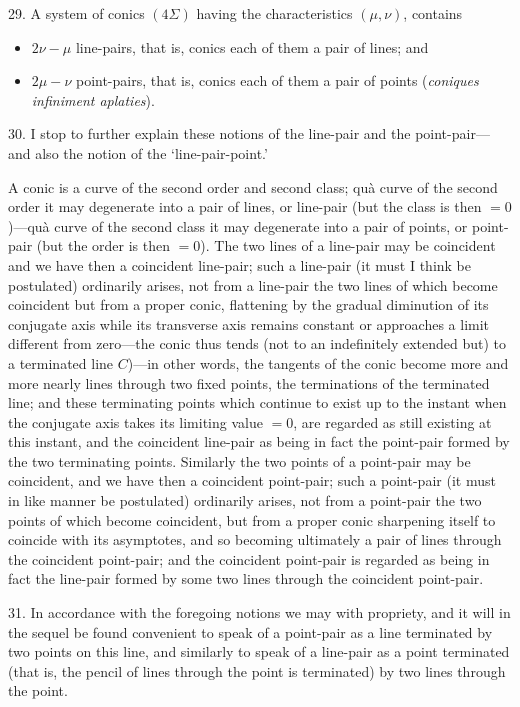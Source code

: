 \documentclass[12pt,a4paper]{article}
\begin{document}
29. A system of conics $(4\Sigma)$ having the characteristics $(\mu, \nu)$, contains
\begin{itemize}[noitemsep,topsep=0pt]
\item $2\nu - \mu$ line-pairs, that is, conics each of them a pair of lines; and
\item $2\mu - \nu$ point-pairs, that is, conics each of them a pair of points (\textit{coniques infiniment aplaties}).
\end{itemize}

30. I stop to further explain these notions of the line-pair and the point-pair---and also the notion of the `line-pair-point.'

A conic is a curve of the second order and second class; qu\`a curve of the second order it may degenerate into a pair of lines, or line-pair (but the class is then $=0$)---qu\`a curve of the second class it may degenerate into a pair of points, or point-pair (but the order is then $=0$). The two lines of a line-pair may be coincident and we have then a coincident line-pair; such a line-pair (it must I think be postulated) ordinarily arises, not from a line-pair the two lines of which become coincident but from a proper conic, flattening by the gradual diminution of its conjugate axis while its transverse axis remains constant or approaches a limit different from zero---the conic thus tends (not to an indefinitely extended but) to a terminated line $C$)---in other words, the tangents of the conic become more and more nearly lines through two fixed points, the terminations of the terminated line; and these terminating points which continue to exist up to the instant when the conjugate axis takes its limiting value $=0$, are regarded as still existing at this instant, and the coincident line-pair as being in fact the point-pair formed by the two terminating points. Similarly the two points of a point-pair may be coincident, and we have then a coincident point-pair; such a point-pair (it must in like manner be postulated) ordinarily arises, not from a point-pair the two points of which become coincident, but from a proper conic sharpening itself to coincide with its asymptotes, and so becoming ultimately a pair of lines through the coincident point-pair; and the coincident point-pair is regarded as being in fact the line-pair formed by some two lines through the coincident point-pair.

31. In accordance with the foregoing notions we may with propriety, and it will in the sequel be found convenient to speak of a point-pair as a line terminated by two points on this line, and similarly to speak of a line-pair as a point terminated (that is, the pencil of lines through the point is terminated) by two lines through the point.
\end{document}
